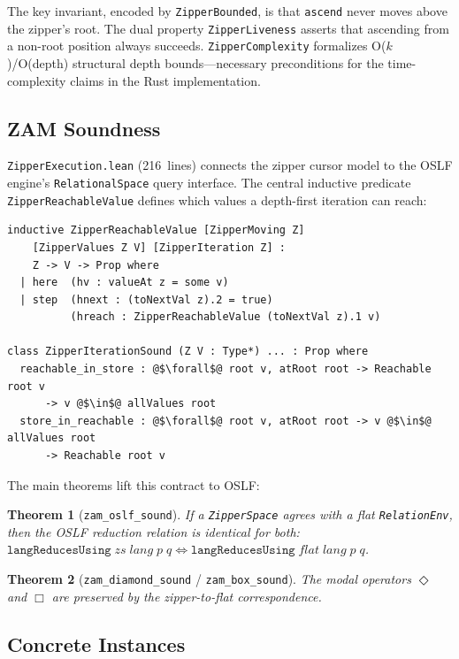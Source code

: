 \documentclass[11pt]{article}
\newtheorem{theorem}{Theorem}[section]
\theoremstyle{definition}
\theoremstyle{remark}
\begin{document}
\noindent
The key invariant, encoded by \texttt{ZipperBounded}, is that
\texttt{ascend} never moves above the zipper's root.
The dual property \texttt{ZipperLiveness} asserts that ascending
from a non-root position always succeeds.
\texttt{ZipperComplexity} formalizes O($k$)/O(depth) structural depth
bounds---necessary preconditions for the time-complexity claims in the
Rust implementation.

\subsection{ZAM Soundness}

\texttt{ZipperExecution.lean} (216~lines) connects the zipper cursor model
to the OSLF engine's \texttt{RelationalSpace} query interface.
The central inductive predicate \texttt{ZipperReachableValue} defines which
values a depth-first iteration can reach:

\begin{lstlisting}[caption={Reachability and soundness contract.}]
inductive ZipperReachableValue [ZipperMoving Z]
    [ZipperValues Z V] [ZipperIteration Z] :
    Z -> V -> Prop where
  | here  (hv : valueAt z = some v)
  | step  (hnext : (toNextVal z).2 = true)
          (hreach : ZipperReachableValue (toNextVal z).1 v)

class ZipperIterationSound (Z V : Type*) ... : Prop where
  reachable_in_store : @$\forall$@ root v, atRoot root -> Reachable root v
      -> v @$\in$@ allValues root
  store_in_reachable : @$\forall$@ root v, atRoot root -> v @$\in$@ allValues root
      -> Reachable root v
\end{lstlisting}

\noindent
The main theorems lift this contract to OSLF:

\begin{theorem}[\texttt{zam\_oslf\_sound}]
If a \texttt{ZipperSpace} agrees with a flat \texttt{RelationEnv}, then
the OSLF reduction relation is identical for both:
$\texttt{langReducesUsing}\;\mathit{zs}\;\mathit{lang}\;p\;q
\iff
\texttt{langReducesUsing}\;\mathit{flat}\;\mathit{lang}\;p\;q$.
\end{theorem}

\begin{theorem}[\texttt{zam\_diamond\_sound} / \texttt{zam\_box\_sound}]
The modal operators $\Diamond$ and $\Box$ are preserved by the
zipper-to-flat correspondence.
\end{theorem}

\subsection{Concrete Instances}
\end{document}
